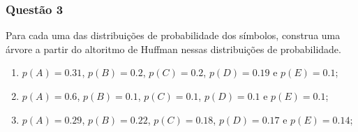 \documentclass[es572.tex]{subfiles}
\begin{document}
        \newpage\subsubsection{Questão 3}
            \begin{exercise}
                Para cada uma das distribuições de probabilidade dos símbolos, construa uma árvore a partir do altoritmo de Huffman nessas distribuições de probabilidade.
                    \begin{enumerate}[noitemsep]
                        \item $p(A) = 0.31$, $p(B) = 0.2$, $p(C) = 0.2$, $p(D) = 0.19$ e $p(E) = 0.1$;

                        \item $p(A) = 0.6$, $p(B) = 0.1$, $p(C) = 0.1$, $p(D) = 0.1$ e $p(E) = 0.1$;

                        \item $p(A) = 0.29$, $p(B) = 0.22$, $p(C) = 0.18$, $p(D) = 0.17$ e $p(E) = 0.14$;
                    \end{enumerate}
            \end{exercise}
\end{document}
